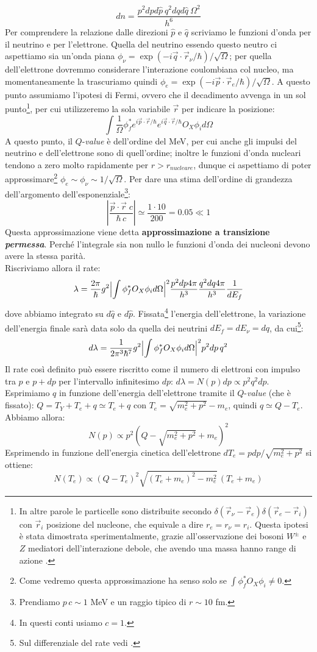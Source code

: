 $$dn = \frac{p^2 dp d\hat{p}\:q^2dqd\hat{q}\:\Omega^2}{h^6}$$
Per comprendere la relazione dalle direzioni $\hat{p}$ e $\hat{q}$ scriviamo le funzioni d'onda per il neutrino e per l'elettrone. Quella del neutrino essendo questo neutro ci aspettiamo sia un'onda piana $\phi_\nu = \exp{(-i\vec{q}\cdot\vec{r}_\nu/\hbar)}/\sqrt{\Omega}$; per quella dell'elettrone dovremmo considerare l'interazione coulombiana col nucleo, ma momentaneamente la trascuriamo quindi $\phi_e = \exp{(-i\vec{p}\cdot\vec{r}_e/\hbar)}/\sqrt{\Omega}$. A questo punto assumiamo l'ipotesi di Fermi, ovvero che il decadimento avvenga in un sol punto\footnote{In altre parole le particelle sono distribuite secondo $\delta(\vec{r}_\nu - \vec{r}_e)\delta(\vec{r}_e-\vec{r}_i)$ con $\vec{r}_i$ posizione del nucleone, che equivale a dire $r_e=r_\nu=r_i$. Questa ipotesi è stata dimostrata sperimentalmente, grazie all'osservazione dei bosoni $W^\pm$ e $Z$ mediatori dell'interazione debole, che avendo una massa  hanno range di azione .}, per cui utilizzeremo la sola variabile $\vec{r}$ per indicare la posizione: 
$$\int \frac{1}{\Omega} \phi^*_f e^{i\vec{p}\cdot\vec{r}/\hbar} e^{i\vec{q}\cdot\vec{r}/\hbar} O_X \phi_i d\Omega$$
A questo punto, il $Q$-\textit{value} è dell'ordine del MeV, per cui anche gli impulsi del neutrino e dell'elettrone sono di quell'ordine; inoltre le funzioni d'onda nucleari tendono a zero molto rapidamente per $r>r_{nucleare}$, dunque ci aspettiamo di poter approssimare\footnote{Come vedremo questa approssimazione ha senso solo se $\int \phi^*_f O_X \phi_i \not = 0$.} $\phi_e\sim\phi_\nu\sim 1/\sqrt{\Omega}$. Per dare una stima dell'ordine di grandezza dell'argomento dell'esponenziale\footnote{Prendiamo $p\,c \sim 1$ MeV e un raggio tipico di $r\sim 10$ fm.}:
$$|\frac{\vec{p}\cdot\vec{r}\; c}{\hbar\,c}|\simeq \frac{1\cdot10}{200}=0.05\ll 1$$
Questa approssimazione viene detta \textbf{approssimazione a transizione \textit{permessa}}. Perché l'integrale sia non nullo le funzioni d'onda dei nucleoni devono avere la stessa parità.\\
Riscriviamo allora il rate:
$$\lambda = \frac{2\pi}{\hbar}g^2 \Bigl |\int \phi_f^* O_X \phi_i d\Omega\Bigr |^2 \frac{p^2 dp 4\pi}{h^3}\frac{q^2dq4\pi}{h^3}\frac{1}{dE_f}$$
dove abbiamo integrato su $d\hat{q}$ e $d\hat{p}$. Fissata\footnote{In questi conti usiamo $c=1$.} l'energia dell'elettrone, la variazione dell'energia finale sarà data solo da quella dei neutrini $dE_f = dE_\nu = dq$, da cui\footnote{Sul differenziale del rate vedi .}:
$$d\lambda = \frac{1}{2\pi^3 \hbar^7}g^2 \Bigl |\int \phi_f^* O_X \phi_i d\Omega\Bigr |^2 p^2 dp\, q^2 $$
Il rate così definito può essere riscritto come il numero di elettroni con impulso tra $p$ e $p+dp$ per l'intervallo infinitesimo $dp$: $d\lambda = N(p)dp \propto p^2 q^2 dp$. Esprimiamo $q$ in funzione dell'energia dell'elettrone tramite il $Q$-\textit{value} (che è fissato): $Q = T_Y + T_e + q \simeq T_e + q$ con $T_e = \sqrt{m_e^2 + p^2}-m_e$, quindi $q \simeq Q-T_e$. Abbiamo allora:
$$N(p) \propto p^2(Q-\sqrt{m_e^2 + p^2}+m_e)^2$$
Esprimendo in funzione dell'energia cinetica dell'elettrone $dT_e = pdp/\sqrt{m_e^2+p^2}$ si ottiene:
$$N(T_e) \propto (Q-T_e)^2 \sqrt{(T_e+m_e)^2-m_e^2}\,(T_e + m_e) $$

